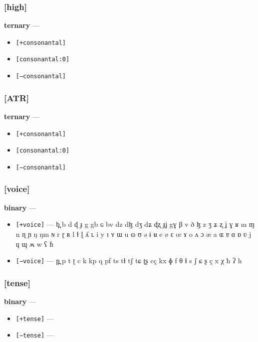 \documentclass[10pt,letterpaper]{article}
\begin{document}
\subsubsection{[high]}
\label{ssub:feature_high}
\textbf{ternary} — 

\begin{itemize}
\item \texttt{[+consonantal]}
\item \texttt{[consonantal:0]}
\item \texttt{[−consonantal]}
\end{itemize}

\subsubsection{[ATR]}
\label{ssub:feature_atr}
\textbf{ternary} — 

\begin{itemize}
\item \texttt{[+consonantal]}
\item \texttt{[consonantal:0]}
\item \texttt{[−consonantal]}
\end{itemize}

\subsubsection{[voice]}
\label{ssub:feature_voice}
\textbf{binary} — 

\begin{itemize}
\item \texttt{[+voice]} — b̪ b d ɖ ɟ g gb ɢ bv dz dɮ dʒ dʑ ɖʐ ɟʝ gɣ β v ð ɮ z ʒ ʑ ʐ ʝ ɣ ʁ m ɱ n ɳ ɲ ŋ ŋm ɴ r ɽ ʀ l ɫ ɭ ʎ ʟ i y ɪ ʏ ɯ u ɷ ʊ ə ɨ ʉ e ø ɛ œ ɤ o ʌ ɔ æ a ɶ ɐ ɑ ɒ ʋ j ɥ ɰ ʍ w ʕ ɦ 

\item \texttt{[−voice]} — p̪ p t ʈ c k kp q pf ts tɬ tʃ tɕ ʈʂ cç kx ɸ f θ ɬ s ʃ ɕ ʂ ç x χ ħ ʔ h 

\end{itemize}

\subsubsection{[tense]}
\label{ssub:feature_tense}
\textbf{binary} — 

\begin{itemize}
\item \texttt{[+tense]} — 
\item \texttt{[−tense]} — 
\end{itemize}
\end{document}
